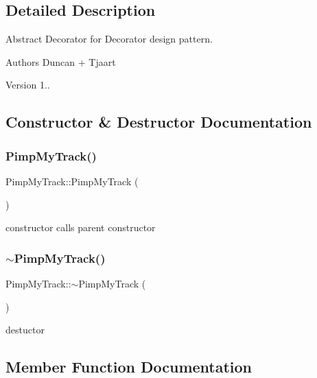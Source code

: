 \subsection{Detailed Description}
Abstract Decorator for Decorator design pattern. 

\begin{DoxyAuthor}{Authors}
Duncan + Tjaart 
\end{DoxyAuthor}
\begin{DoxyVersion}{Version}
1.. 
\end{DoxyVersion}


\subsection{Constructor \& Destructor Documentation}
\mbox{\label{class_pimp_my_track_a8ec014a005a92b99da9d8280fdd47015}} 
\subsubsection{\texorpdfstring{Pimp\+My\+Track()}{PimpMyTrack()}}
{\footnotesize\ttfamily Pimp\+My\+Track\+::\+Pimp\+My\+Track (\begin{DoxyParamCaption}{ }\end{DoxyParamCaption})\hspace{0.3cm}{\ttfamily [inline]}}

constructor calls parent constructor \mbox{\label{class_pimp_my_track_a58f6be4ae459b68816ef376151161756}} 
\subsubsection{\texorpdfstring{$\sim$\+Pimp\+My\+Track()}{~PimpMyTrack()}}
{\footnotesize\ttfamily Pimp\+My\+Track\+::$\sim$\+Pimp\+My\+Track (\begin{DoxyParamCaption}{ }\end{DoxyParamCaption})\hspace{0.3cm}{\ttfamily [inline]}}

destuctor 

\subsection{Member Function Documentation}
\mbox{\label{class_pimp_my_track_a26bee1c8ec01b69eedc788d6199be9f4}} 
